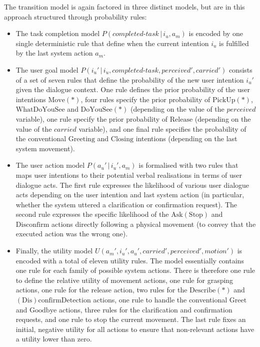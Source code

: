 The transition model is again factored in three distinct models, but are in this approach structured through probability rules:
\begin{itemize}
\item The task completion model $P(\mathit{completed\mbox{-}task}\, | \, i_u, a_m)$ is encoded by one single deterministic rule that define when the current intention $i_u$ is fulfilled by the last system action $a_m$. 
\item The user goal model $P(i_u' \, | \, i_u, \mathit{completed\mbox{-}task}, \mathit{perceived'}, \mathit{carried'})$ consists of a set of seven rules that define the probability of the new user intention $i_u'$ given the dialogue context. One rule defines the prior probability of the user intentions $\mathrm{Move(*)}$, four rules specify the prior probability of $\mathrm{PickUp(*)}$, $\mathrm{WhatDoYouSee}$ and $\mathrm{DoYouSee(*)}$ (depending on the value of the $\mathit{perceived}$ variable), one rule specify the prior probability of $\mathrm{Release}$ (depending on the value of the $\mathit{carried}$ variable), and one final rule specifies the probability of the conventional $\mathrm{Greeting}$ and $\mathrm{Closing}$ intentions (depending on the last system movement). 

\item The user action model $P(a_u'\, | \, i_u', a_m)$ is formalised with two rules that maps user intentions to their potential verbal realisations in terms of user dialogue acts. The first rule expresses the likelihood of various user dialogue acts depending on the user intention and last system action (in particular, whether the system uttered a clarification or confirmation request).  The second rule expresses the specific likelihood of the $\mathrm{Ask(Stop)}$ and $\mathrm{Disconfirm}$ actions directly following a physical movement (to convey that the executed action was the wrong one).

\item Finally, the utility model $U(a_m', i_u', a_u', \mathit{carried'}, \mathit{perceived'}, \mathit{motion'})$ is encoded with a total of eleven utility rules.  The model essentially contains one rule for each family of possible system actions.  There is therefore one rule to define the relative utility of movement actions, one rule for grasping actions, one rule for the release action, two rules for the $\mathrm{Describe(*)}$ and $\mathrm{(Dis)confirmDetection}$ actions, one rule to handle the conventional $\mathrm{Greet}$ and $\mathrm{Goodbye}$ actions, three rules for the clarification and confirmation requests, and one rule to stop the current movement. The last rule fixes an initial, negative utility for all actions to ensure that non-relevant actions have a utility lower than zero.  

\end{itemize}

